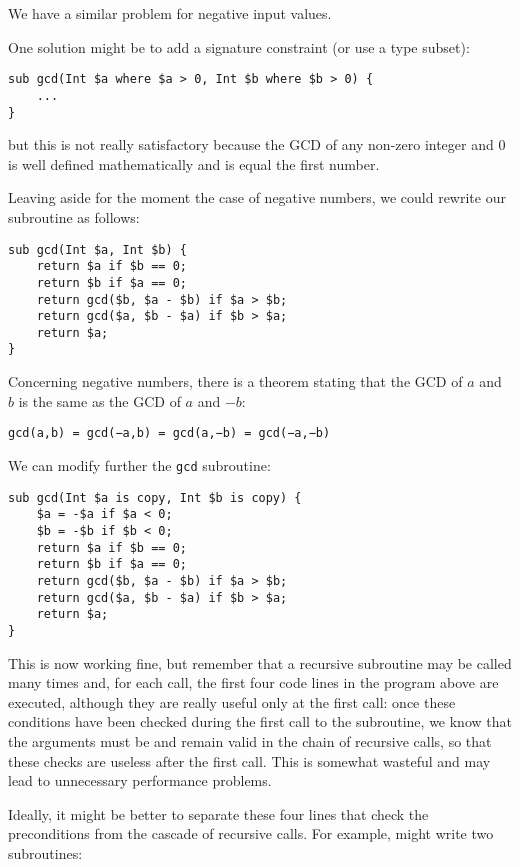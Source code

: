 We have a similar problem for negative input values.

One solution might be to add a signature constraint (or 
use a type subset):
\begin{verbatim}
sub gcd(Int $a where $a > 0, Int $b where $b > 0) {
    ...
}
\end{verbatim}
%

but this is not really satisfactory because the GCD of any 
non-zero integer and 0 is well defined mathematically and 
is equal the first number.

Leaving aside for the moment the case of negative numbers, 
we could rewrite our subroutine as follows:

\begin{verbatim}
sub gcd(Int $a, Int $b) { 
    return $a if $b == 0;
    return $b if $a == 0;
    return gcd($b, $a - $b) if $a > $b;
    return gcd($a, $b - $a) if $b > $a;
    return $a;
}
\end{verbatim}
%

Concerning negative numbers, there is a theorem stating that 
the GCD of $a$ and $b$ is the same as the GCD of $a$ and $-b$:

\begin{center}
{\tt gcd(a,b) = gcd(−a,b) = gcd(a,−b) = gcd(−a,−b)}
\end{center}
%

We can modify further the {\tt gcd} subroutine:

\begin{verbatim}
sub gcd(Int $a is copy, Int $b is copy) { 
    $a = -$a if $a < 0;
    $b = -$b if $b < 0;
    return $a if $b == 0;
    return $b if $a == 0;
    return gcd($b, $a - $b) if $a > $b;
    return gcd($a, $b - $a) if $b > $a;
    return $a;
}
\end{verbatim}
%

This is now working fine, but remember that a recursive 
subroutine may be called many times and, for each call,
the first four code lines in the program above are 
executed, although they are really useful only at the 
first call: once these conditions have been checked during 
the first call to the subroutine, we know that the 
arguments must be and remain valid in the chain of recursive 
calls, so that these checks are useless after the first call.
This is somewhat wasteful and may lead to unnecessary performance problems.

Ideally, it might be better to separate these four lines 
that check the preconditions from the cascade of recursive 
calls. For example, might write two subroutines:

